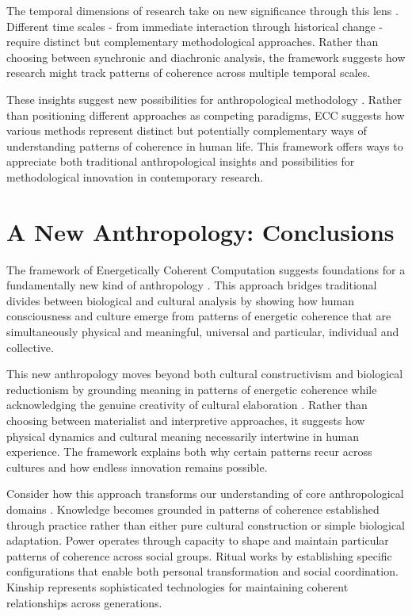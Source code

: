 \begin{refsection}
The temporal dimensions of research take on new significance through this lens \cite{marcus2012multi}. Different time scales - from immediate interaction through historical change - require distinct but complementary methodological approaches. Rather than choosing between synchronic and diachronic analysis, the framework suggests how research might track patterns of coherence across multiple temporal scales.

These insights suggest new possibilities for anthropological methodology \cite{strathern2004partial}. Rather than positioning different approaches as competing paradigms, ECC suggests how various methods represent distinct but potentially complementary ways of understanding patterns of coherence in human life. This framework offers ways to appreciate both traditional anthropological insights and possibilities for methodological innovation in contemporary research.

\section{A New Anthropology: Conclusions}

The framework of Energetically Coherent Computation suggests foundations for a fundamentally new kind of anthropology \cite{rabinow2008marking}. This approach bridges traditional divides between biological and cultural analysis by showing how human consciousness and culture emerge from patterns of energetic coherence that are simultaneously physical and meaningful, universal and particular, individual and collective.

This new anthropology moves beyond both cultural constructivism and biological reductionism by grounding meaning in patterns of energetic coherence while acknowledging the genuine creativity of cultural elaboration \cite{strathern2004commons}. Rather than choosing between materialist and interpretive approaches, it suggests how physical dynamics and cultural meaning necessarily intertwine in human experience. The framework explains both why certain patterns recur across cultures and how endless innovation remains possible.

Consider how this approach transforms our understanding of core anthropological domains \cite{fischer2018anthropology}. Knowledge becomes grounded in patterns of coherence established through practice rather than either pure cultural construction or simple biological adaptation. Power operates through capacity to shape and maintain particular patterns of coherence across social groups. Ritual works by establishing specific configurations that enable both personal transformation and social coordination. Kinship represents sophisticated technologies for maintaining coherent relationships across generations.


\end{refsection}
